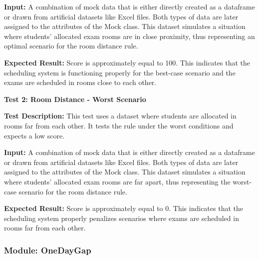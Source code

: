  \textbf{Input:}
A combination of mock data that is either directly created as a dataframe or drawn from
artificial datasets like Excel files. Both types of data are later assigned to the attributes of the
Mock class. This dataset simulates a situation where students' allocated exam rooms are in close
proximity, thus representing an optimal scenario for the room distance rule.

\vspace{\baselineskip}

 
 \textbf{Expected Result:}
 Score is approximately equal to 100. This indicates that the scheduling system
is functioning properly for the best-case scenario and the exams are scheduled in rooms close to
each other.


\vspace{\baselineskip}

 
 \textbf{Test 2: Room Distance - Worst Scenario}


\vspace{\baselineskip}

 
 \textbf{Test Description:}
This test uses a dataset where students are allocated in rooms far from each
other. It tests the rule under the worst conditions and expects a low score.


\vspace{\baselineskip}


 \textbf{Input:}
 A combination of mock data that is either directly created as a dataframe or drawn from
artificial datasets like Excel files. Both types of data are later assigned to the attributes of the
Mock class. This dataset simulates a situation where students' allocated exam rooms are far
apart, thus representing the worst-case scenario for the room distance rule.


\vspace{\baselineskip}

 
 \textbf{Expected Result:}
Score is approximately equal to 0. This indicates that the scheduling system
properly penalizes scenarios where exams are scheduled in rooms far from each other.


\vspace{\baselineskip}



 \subsubsection{Module: OneDayGap}

 
\vspace{\baselineskip}


